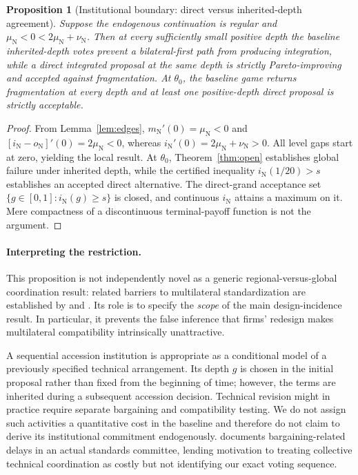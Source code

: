 \documentclass[11pt,a4paper]{article}
\newtheorem{proposition}[theorem]{Proposition}
\theoremstyle{remark}\newtheorem{remark}[theorem]{Remark}
\newcommand{\N}{\mathrm{N}}\newcommand{\F}{\mathrm{F}}
\begin{document}
\begin{proposition}[Institutional boundary: direct versus inherited-depth agreement]\label{prop:direct}
Suppose the endogenous continuation is regular and $\mu_{\N}<0<2\mu_{\N}+\nu_{\N}$. Then at every sufficiently small positive depth the baseline inherited-depth votes prevent a bilateral-first path from producing integration, while a \emph{direct} integrated proposal at the same depth is strictly Pareto-improving and accepted against fragmentation. At $\theta_0$, the baseline game returns fragmentation at every depth and at least one positive-depth direct proposal is strictly acceptable.
\end{proposition}
\begin{proof}
From Lemma~\ref{lem:edges}, $m_{\N}'(0)=\mu_{\N}<0$ and $[i_{\N}-o_{\N}]'(0)=2\mu_{\N}<0$, whereas $i_{\N}'(0)=2\mu_{\N}+\nu_{\N}>0$. All level gaps start at zero, yielding the local result. At $\theta_0$, Theorem~\ref{thm:open} establishes global failure under inherited depth, while the certified inequality $i_{\N}(1/20)>s$ establishes an accepted direct alternative. The direct-grand acceptance set $\{g\in[0,1]:i_{\N}(g)\ge s\}$ is closed, and continuous $i_{\N}$ attains a maximum on it. Mere compactness of a discontinuous terminal-payoff function is not the argument.
\end{proof}

\paragraph{Interpreting the restriction.}
This proposition is not independently novel as a generic regional-versus-global coordination result: related barriers to multilateral standardization are established by \citet{Takarada2020} and \citet{Kawabata2021}. Its role is to specify the \emph{scope} of the main design-incidence result. In particular, it prevents the false inference that firms' redesign makes multilateral compatibility intrinsically unattractive.

A sequential accession institution is appropriate as a conditional model of a previously specified technical arrangement. Its depth $g$ is chosen in the initial proposal rather than fixed from the beginning of time; however, the terms are inherited during a subsequent accession decision. Technical revision might in practice require separate bargaining and compatibility testing. We do not assign such activities a quantitative cost in the baseline and therefore do not claim to derive its institutional commitment endogenously. \citet{Simcoe2012} documents bargaining-related delays in an actual standards committee, lending motivation to treating collective technical coordination as costly but not identifying our exact voting sequence.
\end{document}
